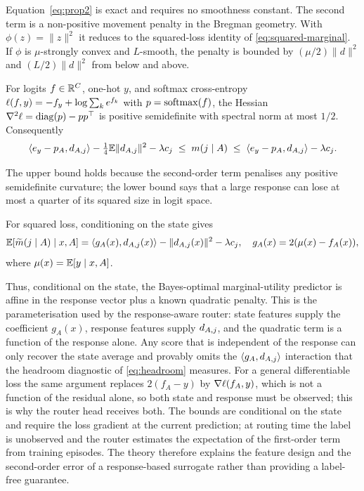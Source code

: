 Equation~\eqref{eq:prop2} is exact and requires no smoothness constant. The
second term is a non-positive movement penalty in the Bregman geometry. With
$\phi(z)=\|z\|^2$ it reduces to the squared-loss identity of
\cref{eq:squared-marginal}. If $\phi$ is $\mu$-strongly convex and $L$-smooth,
the penalty is bounded by $(\mu/2)\|d\|^2$ and $(L/2)\|d\|^2$ from below and
above.

\begin{proposition}
\label{prop:ce}
For logits $f\in\mathbb{R}^C$, one-hot $y$, and softmax cross-entropy
$\ell(f,y)=-f_y+\log\sum_k e^{f_k}$ with $p=\mathrm{softmax}(f)$, the Hessian
$\nabla^2\ell=\mathrm{diag}(p)-pp^\top$ is positive semidefinite with spectral norm at
most $1/2$. Consequently
\begin{equation}
 \langle e_y-p_A,d_{A,j}\rangle-\tfrac14\mathbb{E}\|d_{A,j}\|^2-\lambda c_j
 \;\leq\;
 m(j\mid A)
 \;\leq\;
 \langle e_y-p_A,d_{A,j}\rangle-\lambda c_j .
 \label{eq:prop3}
\end{equation}
\end{proposition}

The upper bound holds because the second-order term penalises any positive
semidefinite curvature; the lower bound says that a large response can lose at
most a quarter of its squared size in logit space.

\begin{proposition}
\label{prop:suff}
For squared loss, conditioning on the state gives
\begin{equation}
 \mathbb{E}\!\left[\widetilde{m}(j\mid A)\mid x,A\right]
 =
 \langle g_A(x),d_{A,j}(x)\rangle-\|d_{A,j}(x)\|^2-\lambda c_j,
 \quad
 g_A(x)=2(\mu(x)-f_A(x)),
 \label{eq:prop4}
\end{equation}
where $\mu(x)=\mathbb{E}[y\mid x,A]$.
\end{proposition}

Thus, conditional on the state, the Bayes-optimal marginal-utility predictor is
affine in the response vector plus a known quadratic penalty. This is the
parameterisation used by the response-aware router: state features supply the
coefficient $g_A(x)$, response features supply $d_{A,j}$, and the quadratic
term is a function of the response alone. Any score that is independent of the
response can only recover the state average and provably omits the
$\langle g_A,d_{A,j}\rangle$ interaction that the headroom diagnostic of
\cref{eq:headroom} measures. For a general differentiable loss the same
argument replaces $2(f_A-y)$ by $\nabla\ell(f_A,y)$, which is not a function
of the residual alone, so both state and response must be observed; this is
why the router head receives both. The bounds are conditional on the state and
require the loss gradient at the current prediction; at routing time the label
is unobserved and the router estimates the expectation of the first-order term
from training episodes. The theory therefore explains the feature design and
the second-order error of a response-based surrogate rather than providing a
label-free guarantee.

